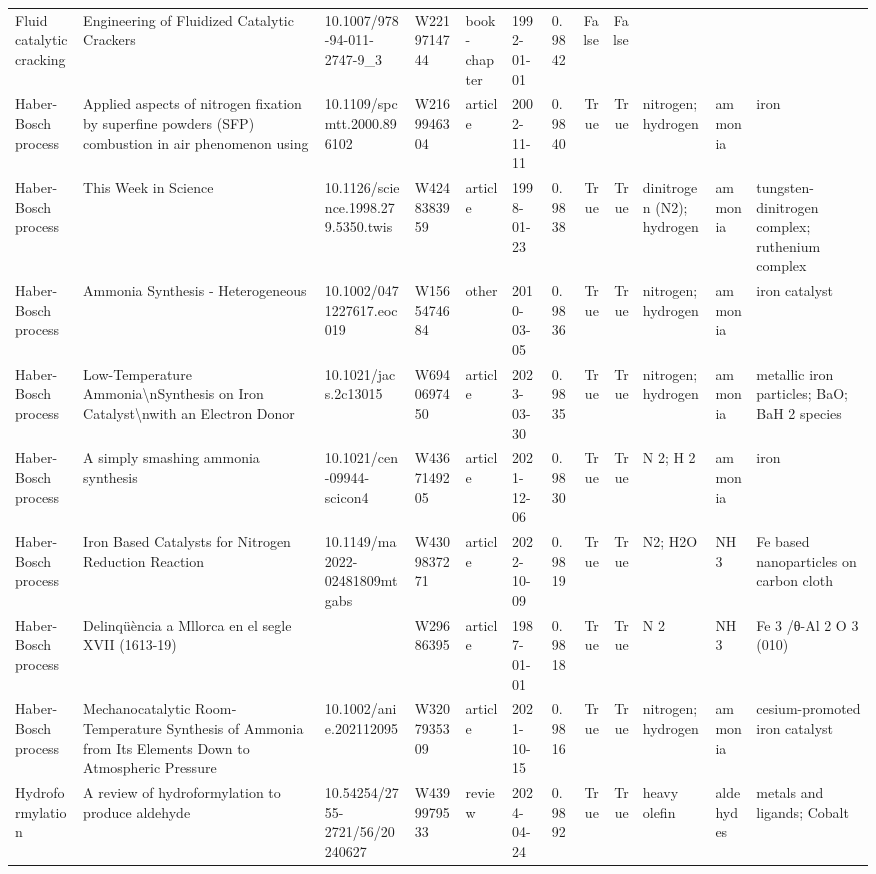 \begin{tabular}{lllllllrrlll}
Fluid catalytic cracking & Engineering of Fluidized Catalytic Crackers & 10.1007/978-94-011-2747-9\_3 & W2219714744 & book-chapter & 1992-01-01 & 0.9842 & False & False &  &  &  \\
Haber-Bosch process & Applied aspects of nitrogen fixation by superfine powders (SFP) combustion in air phenomenon using & 10.1109/spcmtt.2000.896102 & W2169946304 & article & 2002-11-11 & 0.9840 & True & True & nitrogen; hydrogen & ammonia & iron \\
Haber-Bosch process & This Week in Science & 10.1126/science.1998.279.5350.twis & W4248383959 & article & 1998-01-23 & 0.9838 & True & True & dinitrogen (N2); hydrogen & ammonia & tungsten-dinitrogen complex; ruthenium complex \\
Haber-Bosch process & Ammonia Synthesis ‐ Heterogeneous & 10.1002/0471227617.eoc019 & W1565474684 & other & 2010-03-05 & 0.9836 & True & True & nitrogen; hydrogen & ammonia & iron catalyst \\
Haber-Bosch process & Low-Temperature Ammonia\textbackslash nSynthesis on Iron Catalyst\textbackslash nwith an Electron Donor & 10.1021/jacs.2c13015 & W6940697450 & article & 2023-03-30 & 0.9835 & True & True & nitrogen; hydrogen & ammonia & metallic iron particles; BaO; BaH 2 species \\
Haber-Bosch process & A simply smashing ammonia synthesis & 10.1021/cen-09944-scicon4 & W4367149205 & article & 2021-12-06 & 0.9830 & True & True & N 2; H 2 & ammonia & iron \\
Haber-Bosch process & Iron Based Catalysts for Nitrogen Reduction Reaction & 10.1149/ma2022-02481809mtgabs & W4309837271 & article & 2022-10-09 & 0.9819 & True & True & N2; H2O & NH3 & Fe based nanoparticles on carbon cloth \\
Haber-Bosch process & Delinqüència a Mllorca en el segle XVII (1613-19) &  & W29686395 & article & 1987-01-01 & 0.9818 & True & True & N 2 & NH 3 & Fe 3 /θ-Al 2 O 3 (010) \\
Haber-Bosch process & Mechanocatalytic Room‐Temperature Synthesis of Ammonia from Its Elements Down to Atmospheric Pressure & 10.1002/anie.202112095 & W3207935309 & article & 2021-10-15 & 0.9816 & True & True & nitrogen; hydrogen & ammonia & cesium-promoted iron catalyst \\
Hydroformylation & A review of hydroformylation to produce aldehyde & 10.54254/2755-2721/56/20240627 & W4399979533 & review & 2024-04-24 & 0.9892 & True & True & heavy olefin & aldehydes & metals and ligands; Cobalt \\

\end{tabular}
